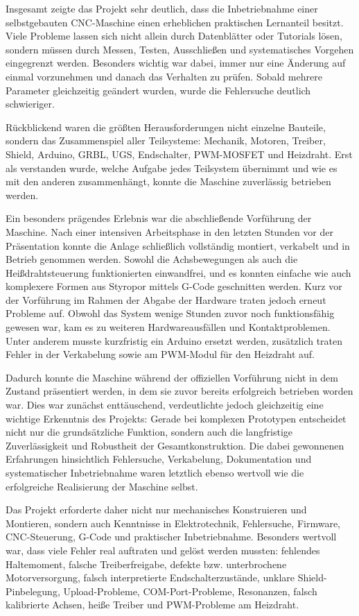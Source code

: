Insgesamt zeigte das Projekt sehr deutlich, dass die Inbetriebnahme einer selbstgebauten CNC-Maschine einen erheblichen praktischen Lernanteil besitzt. Viele Probleme lassen sich nicht allein durch Datenblätter oder Tutorials lösen, sondern müssen durch Messen, Testen, Ausschließen und systematisches Vorgehen eingegrenzt werden. Besonders wichtig war dabei, immer nur eine Änderung auf einmal vorzunehmen und danach das Verhalten zu prüfen. Sobald mehrere Parameter gleichzeitig geändert wurden, wurde die Fehlersuche deutlich schwieriger.

Rückblickend waren die größten Herausforderungen nicht einzelne Bauteile, sondern das Zusammenspiel aller Teilsysteme: Mechanik, Motoren, Treiber, Shield, Arduino, GRBL, UGS, Endschalter, PWM-MOSFET und Heizdraht. Erst als verstanden wurde, welche Aufgabe jedes Teilsystem übernimmt und wie es mit den anderen zusammenhängt, konnte die Maschine zuverlässig betrieben werden.

Ein besonders prägendes Erlebnis war die abschließende Vorführung der Maschine. Nach einer intensiven Arbeitsphase in den letzten Stunden vor der Präsentation konnte die Anlage schließlich vollständig montiert, verkabelt und in Betrieb genommen werden. Sowohl die Achsbewegungen als auch die Heißdrahtsteuerung funktionierten einwandfrei, und es konnten einfache wie auch komplexere Formen aus Styropor mittels G-Code geschnitten werden. Kurz vor der Vorführung im Rahmen der Abgabe der Hardware traten jedoch erneut Probleme auf. Obwohl das System wenige Stunden zuvor noch funktionsfähig gewesen war, kam es zu weiteren Hardwareausfällen und Kontaktproblemen. Unter anderem musste kurzfristig ein Arduino ersetzt werden, zusätzlich traten Fehler in der Verkabelung sowie am PWM-Modul für den Heizdraht auf.

Dadurch konnte die Maschine während der offiziellen Vorführung nicht in dem Zustand präsentiert werden, in dem sie zuvor bereits erfolgreich betrieben worden war. Dies war zunächst enttäuschend, verdeutlichte jedoch gleichzeitig eine wichtige Erkenntnis des Projekts: Gerade bei komplexen Prototypen entscheidet nicht nur die grundsätzliche Funktion, sondern auch die langfristige Zuverlässigkeit und Robustheit der Gesamtkonstruktion. Die dabei gewonnenen Erfahrungen hinsichtlich Fehlersuche, Verkabelung, Dokumentation und systematischer Inbetriebnahme waren letztlich ebenso wertvoll wie die erfolgreiche Realisierung der Maschine selbst.

Das Projekt erforderte daher nicht nur mechanisches Konstruieren und Montieren, sondern auch Kenntnisse in Elektrotechnik, Fehlersuche, Firmware, CNC-Steuerung, G-Code und praktischer Inbetriebnahme. Besonders wertvoll war, dass viele Fehler real auftraten und gelöst werden mussten: fehlendes Haltemoment, falsche Treiberfreigabe, defekte bzw. unterbrochene Motorversorgung, falsch interpretierte Endschalterzustände, unklare Shield-Pinbelegung, Upload-Probleme, COM-Port-Probleme, Resonanzen, falsch kalibrierte Achsen, heiße Treiber und PWM-Probleme am Heizdraht.


